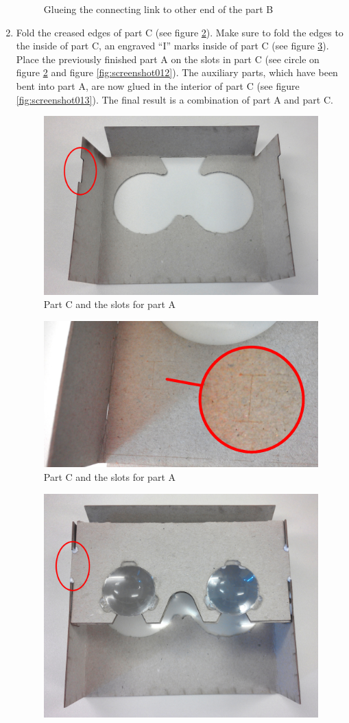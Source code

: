 \documentclass[../../Cardboard_Assembling]{subfiles}
\begin{document}
\begin{enumerate}
\begin{figure}[htb]
		\caption{Glueing the connecting link to other end of the part B}
		\label{fig:screenshot008}
	\end{figure}
	\clearpage
	\item Fold the creased edges of part C (see figure \ref{fig:screenshot011}). Make sure to fold the edges to the inside of part C, an engraved ``I'' marks inside of part C (see figure \ref{fig:partCmark}). Place the previously finished part A on the slots in part C (see circle on figure \ref{fig:screenshot011} and figure \ref{fig:screenshot012}). The auxiliary parts, which have been bent into part A, are now glued in the interior of part C (see figure \ref{fig:screenshot013}). The final result is a combination of part A and part C.
	\begin{figure}[htb]
		\centering
		\includegraphics[width=0.8\linewidth]{partC01}
		\caption{Part C and the slots for part A}
		\label{fig:screenshot011}
	\end{figure}
	\begin{figure}[htb]
		\centering
		\includegraphics[width=0.6\linewidth]{partC02}
		\caption{Part C and the slots for part A}
		\label{fig:partCmark}
	\end{figure}
	\begin{figure}[htb]
		\centering
		\includegraphics[width=0.7\linewidth]{partAC01}

\end{figure}
\end{enumerate}
\end{document}

